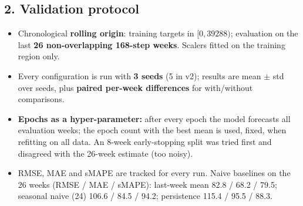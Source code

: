 \documentclass[10.5pt,a4paper]{article}
\begin{document}
\subsection*{2. Validation protocol}
\begin{itemize}
\item Chronological \textbf{rolling origin}: training targets in $[0, 39288)$; evaluation on the last \textbf{26 non-overlapping 168-step weeks}. Scalers fitted on the training region only.
\item Every configuration is run with \textbf{3 seeds} (5 in v2); results are mean $\pm$ std over seeds, plus \textbf{paired per-week differences} for with/without comparisons.
\item \textbf{Epochs as a hyper-parameter:} after every epoch the model forecasts all evaluation weeks; the epoch count with the best mean is used, fixed, when refitting on all data. An 8-week early-stopping split was tried first and disagreed with the 26-week estimate (too noisy).
\item RMSE, MAE and sMAPE are tracked for every run. Naive baselines on the 26 weeks (RMSE / MAE / sMAPE): last-week mean 82.8 / 68.2 / 79.5; seasonal naive (24) 106.6 / 84.5 / 94.2; persistence 115.4 / 95.5 / 88.3.
\end{itemize}
\end{document}
